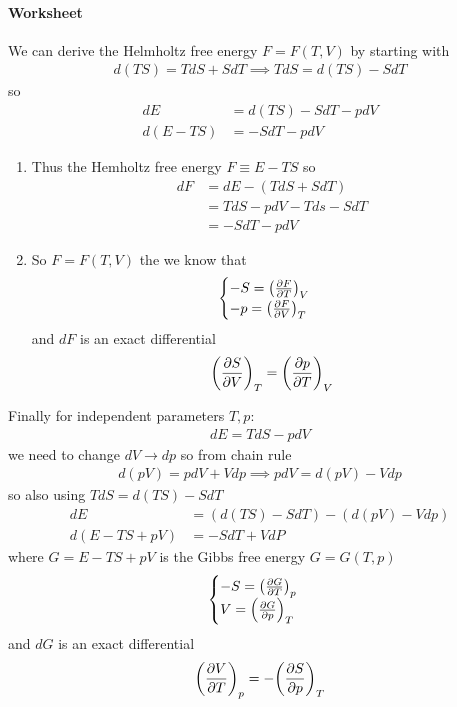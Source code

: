 \documentclass[../main.tex]{subfiles}
\begin{document}
\paragraph{Worksheet}
We can derive the Helmholtz free energy $F = F(T,V)$ by starting with
\begin{align*}
    d(TS) = TdS + SdT \implies TdS = d(TS) - SdT
\end{align*}
so
\begin{align*}
    dE &= d(TS) -SdT - pdV \\
    d(E - TS) &= -SdT - pdV
\end{align*}
\begin{enumerate}
    \item Thus the Hemholtz free energy $F \equiv E - TS$ so
    \begin{align*}
        dF &= dE - (TdS + SdT) \\
        &= TdS - pdV - Tds - SdT \\
        &= -SdT - pdV
    \end{align*}
    \item So $F = F(T,V)$ the we know that
    \begin{align*}
        \begin{cases}
            -S = \qt(\pdv{F}{T})_V \\
            -p = \qt(\pdv{F}{V})_T
        \end{cases}
    \end{align*}
    and $dF$ is an exact differential
    \begin{align*}
        \qt(\pdv{S}{V})_T = \qt(\pdv{p}{T})_V
    \end{align*}
\end{enumerate}
Finally for independent parameters $T,p$:
\begin{align*}
    dE = TdS - pdV 
\end{align*}
we need to change $dV \to dp$ so from chain rule
\begin{align*}
    d(pV) = p dV + V dp \implies pdV = d(pV) - V dp 
\end{align*}
so also using $TdS = d(TS) - S dT$
\begin{align*}
    dE &= (d(TS) - S dT) - (d(pV) - V dp) \\
    d(E - TS + pV) &= -S dT + V dP
\end{align*}
where $G = E - TS + pV$ is the Gibbs free energy $G = G(T,p)$
\begin{align*}
    \begin{cases}
        -S = \qt(\pdv{G}{T})_p \\
        V = \qt(\pdv{G}{p})_T
    \end{cases}
\end{align*}
and $dG$ is an exact differential
\begin{align*}
    \qt(\pdv{V}{T})_p = -\qt(\pdv{S}{p})_T
\end{align*}
\end{document}
